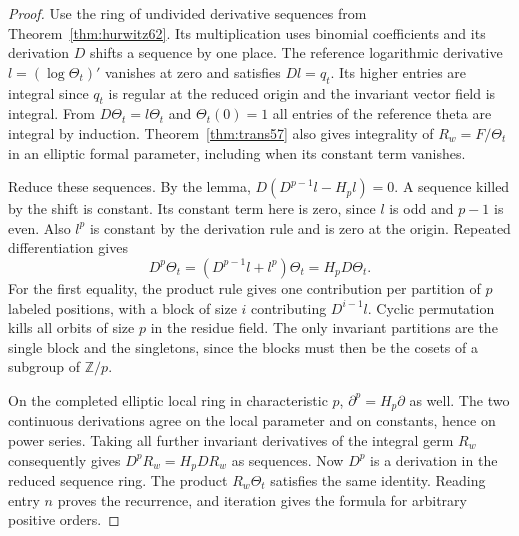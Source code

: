 \documentclass[a4paper,11pt]{article}
\theoremstyle{definition}
\theoremstyle{remark}
\numberwithin{equation}{section}
\begin{document}
\begin{proof}
Use the ring of undivided derivative sequences from
Theorem~\ref{thm:hurwitz62}. Its multiplication uses binomial
coefficients and its derivation \(D\) shifts a sequence by one
place. The reference logarithmic derivative \(l=(\log\Theta_t)'\)
vanishes at zero and satisfies \(Dl=q_t\). Its higher entries are
integral since \(q_t\) is regular at the reduced origin and the
invariant vector field is integral. From \(D\Theta_t=l\Theta_t\)
and \(\Theta_t(0)=1\) all entries of the reference theta are
integral by induction. Theorem~\ref{thm:trans57} also gives
integrality of \(R_w=F/\Theta_t\) in an elliptic formal parameter,
including when its constant term vanishes.

Reduce these sequences. By the lemma,
\(D(D^{p-1}l-H_pl)=0\). A sequence killed by the shift is
constant. Its constant term here is zero, since \(l\) is odd
and \(p-1\) is even. Also \(l^p\) is constant by the derivation
rule and is zero at the origin. Repeated differentiation gives
\[
           D^p\Theta_t=(D^{p-1}l+l^p)\Theta_t
                       = H_pD\Theta_t .
\]
For the first equality, the product rule gives one contribution
per partition of \(p\) labeled positions, with a block of size
\(i\) contributing \(D^{i-1}l\). Cyclic permutation kills all
orbits of size \(p\) in the residue field. The only invariant
partitions are the single block and the singletons, since the
blocks must then be the cosets of a subgroup of \(\mathbb Z/p\).

On the completed elliptic local ring in characteristic \(p\),
\(\partial^p=H_p\partial\) as well. The two continuous
derivations agree on the local parameter and on constants, hence
on power series. Taking all further invariant derivatives of the
integral germ \(R_w\) consequently gives
\(D^pR_w=H_pDR_w\) as sequences. Now \(D^p\) is a derivation in
the reduced sequence ring. The product \(R_w\Theta_t\) satisfies
the same identity. Reading entry \(n\) proves the recurrence, and
iteration gives the formula for arbitrary positive orders.
\end{proof}
\end{document}
